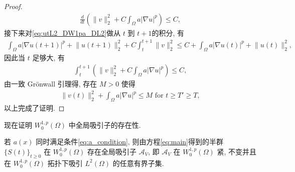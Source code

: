 \documentclass[oneside,longtitle]{LZUthesis}
\numberwithin{equation}{chapter}
\newcommand*\abs[1]{\lvert#1\rvert}
\newcommand*\norm[1]{\lVert#1\rVert}
\newcommand*\Brace[1]{\lbrace#1\rbrace}
\begin{document}
\begin{proof}
\begin{equation*}
		\begin{split}
			\frac{d}{dt}\left(
			\norm{v}_2^2 + C\int_{\Omega}a\abs{\nabla u}^p
			\right)
			\leq C,
		\end{split}
	\end{equation*}
	接下来对\cref{eq:utL2_DW1pa_DL2}做从 $t$ 到 $t+1$的积分, 有
	\begin{equation*}
		\begin{split}
			\int_{\Omega}a\abs{\nabla u(t+1)}^p
			+ \norm{u(t+1)}_2^2
			+ C\int_t^{t+1}\norm{v}_2^2
			\leq C + \int_{\Omega}a\abs{\nabla u(t)}^p
			+ \norm{u(t)}_2^2,
		\end{split}
	\end{equation*}
	因此当 $t$ 足够大, 有
	\begin{equation*}
		\begin{split}
			\int_t^{t+1}\left(
			\norm{v}_2^2 + C\int_{\Omega}a\abs{\nabla u}^p
			\right) \leq C,
		\end{split}
	\end{equation*}
	由一致 Gr\"onwall 引理得, 存在 $M > 0$ 使得
	\begin{equation*}
		\begin{split}
			\norm{v(t)}_2^2
			+ \int_{\Omega}a\abs{\nabla u}^p \leq M \text{ for } t \geq T' \geq T,
		\end{split}
	\end{equation*}
	以上完成了证明.
\end{proof}
现在证明
$W_0^{1,p}(\Omega)$ 中全局吸引子的存在性.
\begin{theorem}
	若 $a(x)$ 同时满足条件\eqref{eq:a_condition},
	则由方程\eqref{eq:main}得到的半群 $\Brace{S(t)}_{t \geq 0}$ 在 $W_0^{1,p}(\Omega)$
	存在全局吸引子 $\mathcal{A}_V$, 即
	$\mathcal{A}_V$ 在 $W_0^{1,p}(\Omega)$ 紧, 不变并且在 $W_0^{1,p}(\Omega)$
	拓扑下吸引 $L^2(\Omega)$ 的任意有界子集.
\end{theorem}
\end{document}
